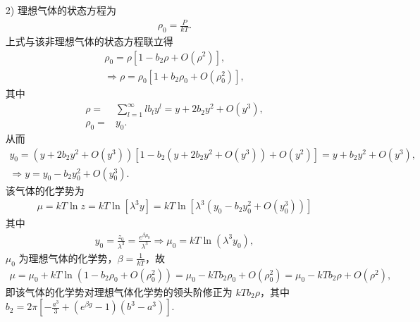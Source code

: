 \documentclass{assignment}
\begin{document}
\begin{sol}
\begin{itemize}
        \item[2)] 理想气体的状态方程为
        \begin{align}
            \rho_0=\frac{P}{kT}.
        \end{align}
        上式与该非理想气体的状态方程联立得
        \begin{gather}
            \rho_0=\rho[1-b_2\rho+O(\rho^2)],\\
            \Longrightarrow \rho=\rho_0\left[1+b_2\rho_0+O(\rho_0^2)\right],
        \end{gather}
        其中
        \begin{align}
            \rho=&\sum_{l=1}^{\infty}lb_ly^l=y+2b_2y^2+O(y^3),\\
            \rho_0=&y_0.
        \end{align}
        从而
        \begin{gather}
            y_0=(y+2b_2y^2+O(y^3))[1-b_2(y+2b_2y^2+O(y^3))+O(y^2)]=y+b_2y^2+O(y^3),\\
            \Longrightarrow y=y_0-b_2y_0^2+O(y_0^3).
        \end{gather}
        该气体的化学势为
        \begin{align}
            \mu=kT\ln z=kT\ln[\lambda^3 y]=kT\ln\left[\lambda^3(y_0-b_2y_0^2+O(y_0^3))\right]
        \end{align}
        其中
        \begin{align}
            y_0=\frac{z_0}{\lambda^3}=\frac{e^{\beta\mu_0}}{\lambda^3}\Longrightarrow\mu_0=kT\ln(\lambda^3y_0),
        \end{align}
        $\mu_0$ 为理想气体的化学势，$\beta=\frac{1}{kT}$，故
        \begin{align}
            \mu=\mu_0+kT\ln(1-b_2\rho_0+O(\rho_0^2))=\mu_0-kTb_2\rho_0+O(\rho_0^2)=\mu_0-kTb_2\rho+O(\rho^2),
        \end{align}
        即该气体的化学势对理想气体化学势的领头阶修正为 \uline{$kTb_2\rho$}，其中 $b_2=2\pi\left[-\frac{a^3}{3}+(e^{\beta g}-1)(b^3-a^3)\right]$.

\end{itemize}
\end{sol}
\end{document}
